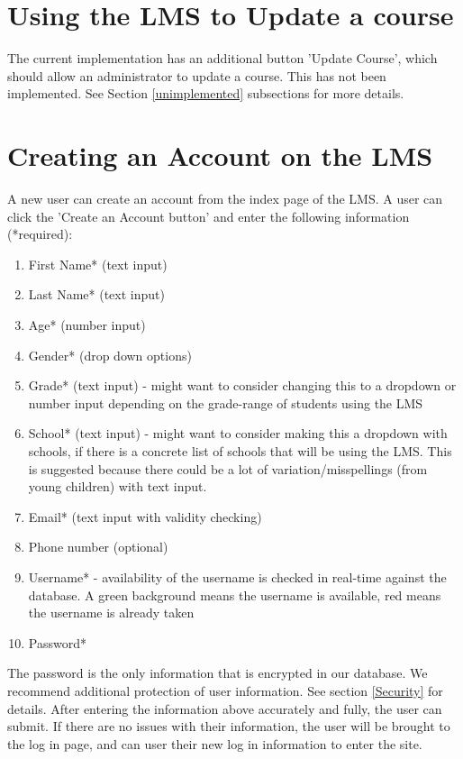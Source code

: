 \documentclass[12pt]{article}
\begin{document}
\section{Using the LMS to Update a course}
The current implementation has an additional button 'Update Course', which should allow an administrator to update a course. This has not been implemented. See Section \ref{unimplemented} subsections for more details.

\section{Creating an Account on the LMS}
A new user can create an account from the index page of the LMS. A user can click the 'Create an Account button' and enter the following information (*required):
\begin{enumerate}

\item First Name* (text input)
\item Last Name* (text input)
\item Age* (number input)
\item Gender* (drop down options)
\item Grade* (text input) - might want to consider changing this to a dropdown or number input depending on the grade-range of students using the LMS
\item School* (text input) - might want to consider making this a dropdown with schools, if there is a concrete list of schools that will be using the LMS. This is suggested because there could be a lot of variation/misspellings (from young children) with text input.
\item Email* (text input with validity checking)
\item Phone number (optional)
\item Username* - availability of the username is checked in real-time against the database. A green background means the username is available, red means the username is already taken
\item Password* 
\end{enumerate}
The password is the only information that is encrypted in our database. We recommend additional protection of user information. See section \ref{Security} for details.
After entering the information above accurately and fully, the user can submit. If there are no issues with their information, the user will be brought to the log in page, and can user their new log in information to enter the site. 
\end{document}
